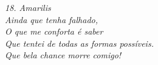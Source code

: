 \clearpage
\thispagestyle{empty}

\vspace*{\fill}

\begin{flushright}
    \itshape
    18. Amarilis \\[0.5cm]

    Ainda que tenha falhado, \\
    O que me conforta é saber \\
    Que tentei de todas as formas possíveis. \\
    Que bela chance morre comigo!    
\end{flushright}

\clearpage
